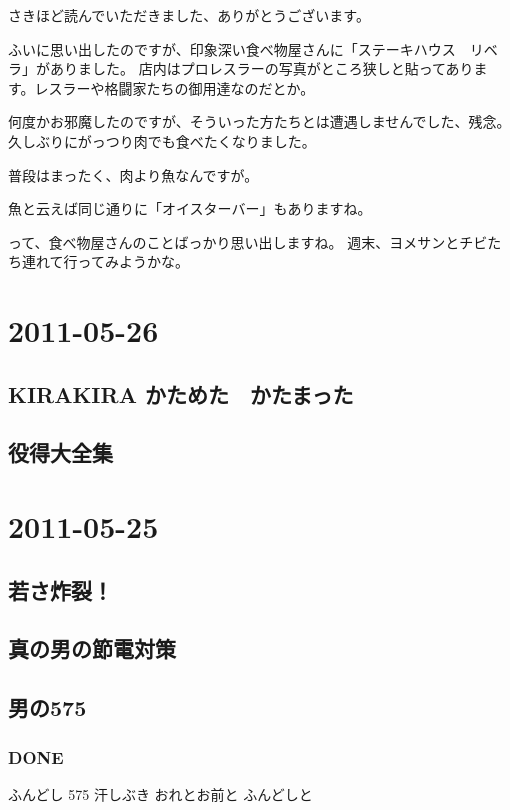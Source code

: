 \documentclass[11pt]{article}
\begin{document}
さきほど読んでいただきました、ありがとうございます。

ふいに思い出したのですが、印象深い食べ物屋さんに「ステーキハウス　リベラ」がありました。
店内はプロレスラーの写真がところ狭しと貼ってあります。レスラーや格闘家たちの御用達なのだとか。

何度かお邪魔したのですが、そういった方たちとは遭遇しませんでした、残念。
久しぶりにがっつり肉でも食べたくなりました。

普段はまったく、肉より魚なんですが。

魚と云えば同じ通りに「オイスターバー」もありますね。

って、食べ物屋さんのことばっかり思い出しますね。
週末、ヨメサンとチビたち連れて行ってみようかな。
\subsection{}
\section{2011-05-26}
\label{sec-117}
\subsection{KIRAKIRA かためた　かたまった}
\label{sec-117_1}
\subsection{役得大全集}
\label{sec-117_2}
\section{2011-05-25}
\label{sec-118}
\subsection{若さ炸裂！}
\label{sec-118_1}
\subsection{真の男の節電対策}
\label{sec-118_2}
\subsection{男の575}
\label{sec-118_3}
\subsubsection{\textbf{DONE}}
\label{sec-118_3_1}

ふんどし 575
汗しぶき おれとお前と ふんどしと
\end{document}
